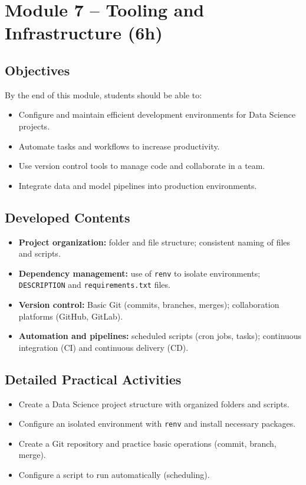 \section{\textcolor{sectionred}{Module 7 – Tooling and Infrastructure (6h)}}

\subsection{\textcolor{subsectionblue}{Objectives}}
By the end of this module, students should be able to:
\begin{itemize}
  \item Configure and maintain efficient development environments for Data Science projects.
  \item Automate tasks and workflows to increase productivity.
  \item Use version control tools to manage code and collaborate in a team.
  \item Integrate data and model pipelines into production environments.
\end{itemize}

\subsection{\textcolor{subsectionblue}{Developed Contents}}
\begin{itemize}
  \item \textbf{Project organization:} folder and file structure; consistent naming of files and scripts.
  \item \textbf{Dependency management:} use of \texttt{renv} to isolate environments; \texttt{DESCRIPTION} and \texttt{requirements.txt} files.
  \item \textbf{Version control:} Basic Git (commits, branches, merges); collaboration platforms (GitHub, GitLab).
  \item \textbf{Automation and pipelines:} scheduled scripts (cron jobs, tasks); continuous integration (CI) and continuous delivery (CD).
\end{itemize}

\subsection{\textcolor{subsectionblue}{Detailed Practical Activities}}
\begin{itemize}
  \item Create a Data Science project structure with organized folders and scripts.
  \item Configure an isolated environment with \texttt{renv} and install necessary packages.
  \item Create a Git repository and practice basic operations (commit, branch, merge).
  \item Configure a script to run automatically (scheduling).
\end{itemize}

